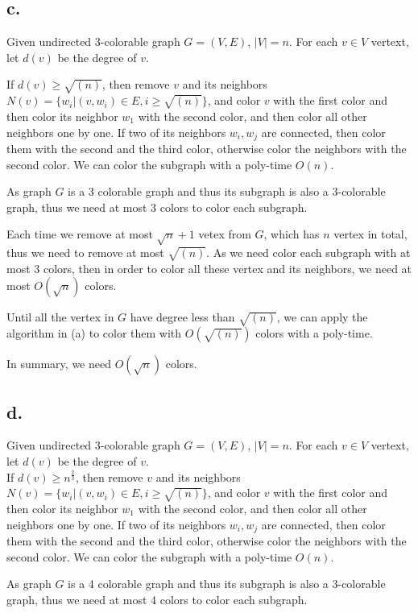 \documentclass[a4paper,12pt]{article}
\begin{document}
\subsection*{c.}
Given undirected 3-colorable graph $G=(V,E)$,  $|V|=n$.
For each $v \in V$ vertext, let $d(v)$ be the degree of $v$.

If $d(v)\geq \sqrt{(n)}$, then remove $v$ and its neighbors $N(v)=\{w_i| (v,w_i) \in E, i\geq \sqrt{(n)}\}$, and color $v$ with the first color and then color its neighbor $w_1$ with the second color, and then color all other neighbors one by one. If two of its neighbors $w_i, w_j$ are connected, then color them with the second and the third color, otherwise color the neighbors with the second color. We can color the subgraph with a poly-time $O(n)$.

As graph $G$ is a 3 colorable graph and thus its subgraph is also a 3-colorable graph, thus we need at most 3 colors to color each subgraph. 

Each time we remove at most $\sqrt{n}+1$ vetex from $G$, which has $n$ vertex in total, thus we need to remove at most $ \sqrt{(n)} $. As we need color each subgraph with at most 3 colors, then in order to color all these vertex and its neighbors, we need at most $O(\sqrt{n})$ colors. 

Until all the vertex in $G$ have degree less than $\sqrt{(n)}$, we can apply the algorithm in (a) to color them with $O(\sqrt{(n)})$ colors with a poly-time.

In summary, we need $O(\sqrt{n}) $ colors.
\subsection*{d.}
Given undirected 3-colorable graph $G=(V,E)$,  $|V|=n$.
For each $v \in V$ vertext, let $d(v)$ be the degree of $v$.\\
If $d(v)\geq n^{\frac{2}{3}}$, then remove $v$ and its neighbors $N(v)=\{w_i| (v,w_i) \in E, i\geq \sqrt{(n)}\}$, and color $v$ with the first color and then color its neighbor $w_1$ with the second color, and then color all other neighbors one by one. If two of its neighbors $w_i, w_j$ are connected, then color them with the second and the third color, otherwise color the neighbors with the second color. We can color the subgraph with a poly-time $O(n)$.

As graph $G$ is a 4 colorable graph and thus its subgraph is also a 3-colorable graph, thus we need at most 4 colors to color each subgraph. 
\end{document}
